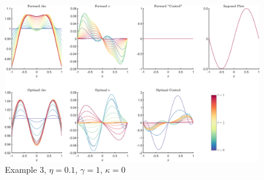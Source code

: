 \documentclass[11pt, a4paper]{article}
\theoremstyle{definition}
\begin{document}
\begin{figure}[h]
	\centering
	\includegraphics[scale=0.04]{Example3a.png}
	\caption{Example 3, $\eta = 0.1$, $\gamma = 1$, $\kappa = 0$} 
	\label{F7}
\end{figure}
\end{document}
